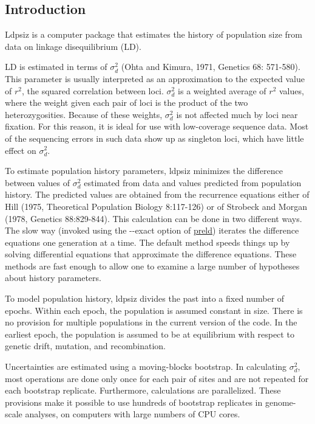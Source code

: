 \hypertarget{index_mainpage}{}\subsection{Introduction}\label{index_mainpage}
Ldpsiz is a computer package that estimates the history of population size from data on linkage disequilibrium (L\-D).

L\-D is estimated in terms of $\sigma_d^2$ (Ohta and Kimura, 1971, Genetics 68\-: 571-\/580). This parameter is usually interpreted as an approximation to the expected value of $r^2$, the squared correlation between loci. $\sigma_d^2$ is a weighted average of $r^2$ values, where the weight given each pair of loci is the product of the two heterozygosities. Because of these weights, $\sigma_d^2$ is not affected much by loci near fixation. For this reason, it is ideal for use with low-\/coverage sequence data. Most of the sequencing errors in such data show up as singleton loci, which have little effect on $\sigma_d^2$.

To estimate population history parameters, {\ttfamily ldpsiz} minimizes the difference between values of $\sigma_d^2$ estimated from data and values predicted from population history. The predicted values are obtained from the recurrence equations either of Hill (1975, Theoretical Population Biology 8\-:117-\/126) or of Strobeck and Morgan (1978, Genetics 88\-:829-\/844). This calculation can be done in two different ways. The slow way (invoked using the {\ttfamily -\/-\/exact} option of \hyperlink{preld_8c_preld}{preld}) iterates the difference equations one generation at a time. The default method speeds things up by solving differential equations that approximate the difference equations. These methods are fast enough to allow one to examine a large number of hypotheses about history parameters.

To model population history, {\ttfamily ldpsiz} divides the past into a fixed number of epochs. Within each epoch, the population is assumed constant in size. There is no provision for multiple populations in the current version of the code. In the earliest epoch, the population is assumed to be at equilibrium with respect to genetic drift, mutation, and recombination.

Uncertainties are estimated using a moving-\/blocks bootstrap. In calculating $\sigma_d^2$, most operations are done only once for each pair of sites and are not repeated for each bootstrap replicate. Furthermore, calculations are parallelized. These provisions make it possible to use hundreds of bootstrap replicates in genome-\/scale analyses, on computers with large numbers of C\-P\-U cores.

